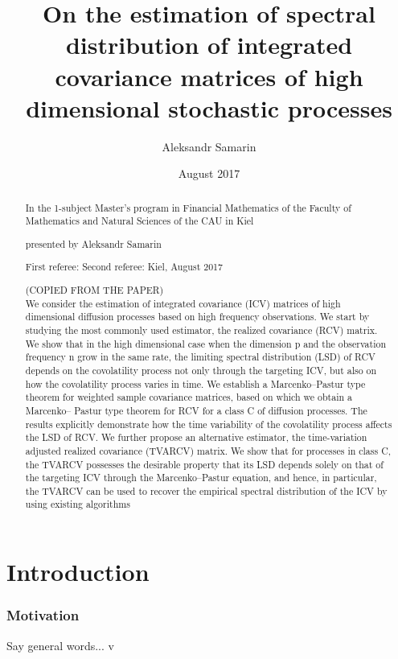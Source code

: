 \documentclass[a4paper,11pt]{article}
\title{On the estimation of spectral distribution of integrated covariance matrices of high dimensional stochastic processes}
\author{Aleksandr Samarin}
\date{August 2017}
\theoremstyle{plain}
\theoremstyle{definition}
\begin{document}
	\maketitle
	
	\begin{abstract}
		In the 1-subject Master's program in Financial Mathematics of the Faculty of Mathematics and Natural Sciences of the CAU in Kiel
		
		presented by Aleksandr Samarin
		
		First referee:
		Second referee:
		Kiel, August 2017
		
		(COPIED FROM THE PAPER) \\
		We consider the estimation of integrated covariance (ICV) matrices
		of high dimensional diffusion processes based on high frequency
		observations. We start by studying the most commonly used estimator,
		the realized covariance (RCV) matrix. We show that in the
		high dimensional case when the dimension p and the observation frequency
		n grow in the same rate, the limiting spectral distribution
		(LSD) of RCV depends on the covolatility process not only through
		the targeting ICV, but also on how the covolatility process varies in
		time. We establish a Marcenko–Pastur type theorem for weighted
		sample covariance matrices, based on which we obtain a Marcenko–
		Pastur type theorem for RCV for a class C of diffusion processes.
		The results explicitly demonstrate how the time variability of the
		covolatility process affects the LSD of RCV. We further propose
		an alternative estimator, the time-variation adjusted realized covariance
		(TVARCV) matrix. We show that for processes in class C, the
		TVARCV possesses the desirable property that its LSD depends
		solely on that of the targeting ICV through the Marcenko–Pastur
		equation, and hence, in particular, the TVARCV can be used to recover
		the empirical spectral distribution of the ICV by using existing
		algorithms
	\end{abstract}
	
	\pagebreak
	\tableofcontents
	
	\pagebreak
	\part{Introduction}
	
	\section*{Motivation}
    Say general words...  v
    
\end{document}
